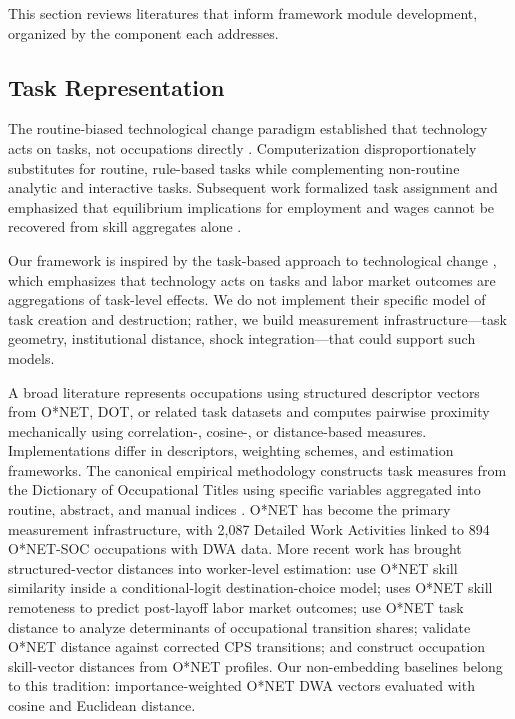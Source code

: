 \documentclass[12pt]{article}
\begin{document}
This section reviews literatures that inform framework module development, organized by the component each addresses.


\subsection{Task Representation}
\label{subsec:lit-task}


The routine-biased technological change paradigm established that technology acts on tasks, not occupations directly \citep{AutorLevyMurnane2003}. Computerization disproportionately substitutes for routine, rule-based tasks while complementing non-routine analytic and interactive tasks. Subsequent work formalized task assignment and emphasized that equilibrium implications for employment and wages cannot be recovered from skill aggregates alone \citep{AcemogluAutor2011}.

Our framework is inspired by the task-based approach to technological change \citep{AcemogluAutor2011,AcemogluRestrepo2018}, which emphasizes that technology acts on tasks and labor market outcomes are aggregations of task-level effects. We do not implement their specific model of task creation and destruction; rather, we build measurement infrastructure---task geometry, institutional distance, shock integration---that could support such models.

A broad literature represents occupations using structured descriptor vectors from O*NET, DOT, or related task datasets and computes pairwise proximity mechanically using correlation-, cosine-, or distance-based measures. Implementations differ in descriptors, weighting schemes, and estimation frameworks. The canonical empirical methodology constructs task measures from the Dictionary of Occupational Titles using specific variables aggregated into routine, abstract, and manual indices \citep{AutorDorn2013}. O*NET has become the primary measurement infrastructure, with 2,087 Detailed Work Activities linked to 894 O*NET-SOC occupations with DWA data. More recent work has brought structured-vector distances into worker-level estimation: \citet{MouwEtAl2024} use O*NET skill similarity inside a conditional-logit destination-choice model; \citet{Macaluso2025} uses O*NET skill remoteness to predict post-layoff labor market outcomes; \citet{SchuStanTaska2024} use O*NET task distance to analyze determinants of occupational transition shares; \citet{CarrilloTudelaEtAl2025} validate O*NET distance against corrected CPS transitions; and \citet{KudlyakWolcott2019} construct occupation skill-vector distances from O*NET profiles. Our non-embedding baselines belong to this tradition: importance-weighted O*NET DWA vectors evaluated with cosine and Euclidean distance.
\end{document}
